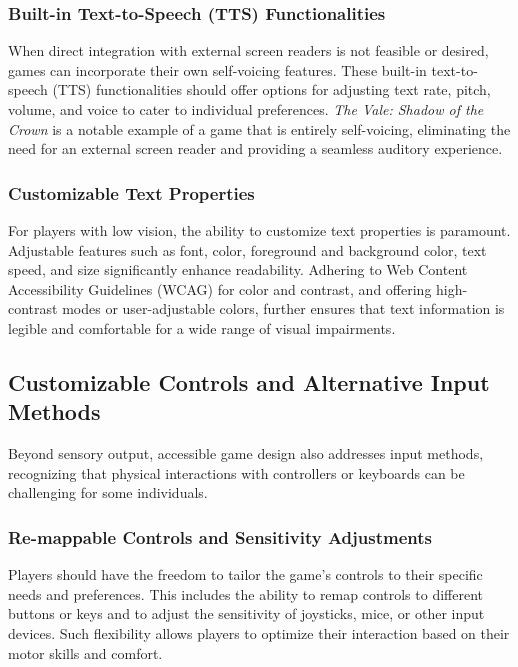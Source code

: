 \subsubsection{Built-in Text-to-Speech (TTS) Functionalities}

When direct integration with external screen readers is not feasible or desired, games can incorporate their own self-voicing features. These built-in text-to-speech (TTS) functionalities should offer options for adjusting text rate, pitch, volume, and voice to cater to individual preferences\supercite{AFBIntroVG}. \textit{The Vale: Shadow of the Crown} is a notable example of a game that is entirely self-voicing, eliminating the need for an external screen reader and providing a seamless auditory experience\supercite{AFBValeReview}.

\subsubsection{Customizable Text Properties}

For players with low vision, the ability to customize text properties is paramount. Adjustable features such as font, color, foreground and background color, text speed, and size significantly enhance readability\supercite{AFBIntroVG}. Adhering to Web Content Accessibility Guidelines (WCAG) for color and contrast, and offering high-contrast modes or user-adjustable colors, further ensures that text information is legible and comfortable for a wide range of visual impairments\supercite{AFBIntroVG}.

\subsection{Customizable Controls and Alternative Input Methods}

Beyond sensory output, accessible game design also addresses input methods, recognizing that physical interactions with controllers or keyboards can be challenging for some individuals.

\subsubsection{Re-mappable Controls and Sensitivity Adjustments}

Players should have the freedom to tailor the game's controls to their specific needs and preferences. This includes the ability to remap controls to different buttons or keys and to adjust the sensitivity of joysticks, mice, or other input devices\supercite{Wayline2025}. Such flexibility allows players to optimize their interaction based on their motor skills and comfort.

